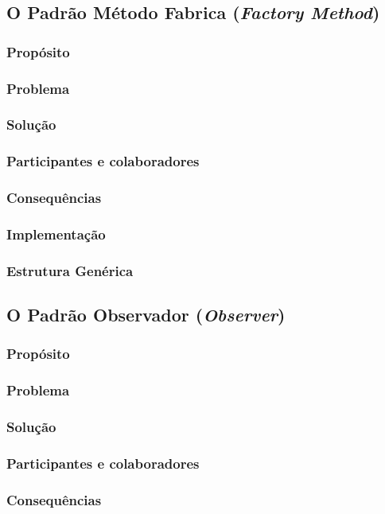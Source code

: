 \documentclass[
	11pt,				%
	openright,
	twoside,			%
	a4paper,			%
	english,			%
	french,
	brazil,				%
	sumario=tradicional
	]{abntex2}
\begin{document}
\subsection{O Padrão Método Fabrica (\textit{Factory Method})}
\subsubsection{Propósito}
\subsubsection{Problema}
\subsubsection{Solução}
\subsubsection{Participantes e colaboradores}
\subsubsection{Consequências}
\subsubsection{Implementação}
\subsubsection{Estrutura Genérica}

\subsection{O Padrão Observador (\textit{Observer})}
\subsubsection{Propósito}
\subsubsection{Problema}
\subsubsection{Solução}
\subsubsection{Participantes e colaboradores}
\subsubsection{Consequências}
\end{document}
